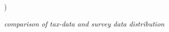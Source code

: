 \documentclass[twoside]{article}\usepackage[]{graphicx}\usepackage[]{color}
\newenvironment{knitrout}{}{} %
\begin{document}
\begin{multicols}{2}
     )









\emph{comparison of tax-data and survey data distribution}




\begin{knitrout}
\color{fgcolor}\begin{figure}[H]


\end{figure}
\end{knitrout}
\end{multicols}
\end{document}
